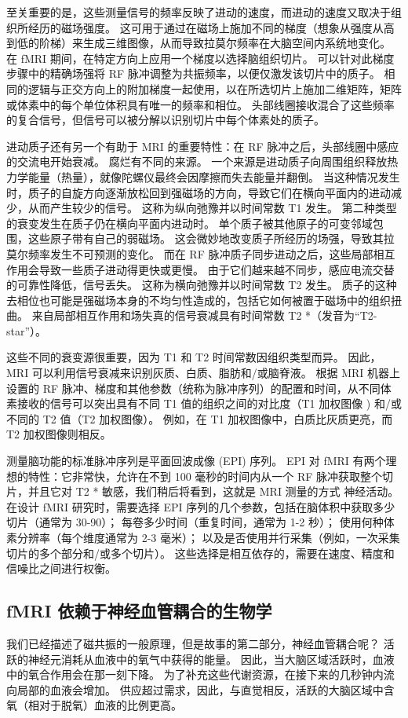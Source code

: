 至关重要的是，这些测量信号的频率反映了进动的速度，而进动的速度又取决于组织所经历的磁场强度。 这可用于通过在磁场上施加不同的梯度（想象从强度从高到低的阶梯）来生成三维图像，从而导致拉莫尔频率在大脑空间内系统地变化。 在 fMRI 期间，在特定方向上应用一个梯度以选择脑组织切片。 可以针对此梯度步骤中的精确场强将 RF 脉冲调整为共振频率，以便仅激发该切片中的质子。 相同的逻辑与正交方向上的附加梯度一起使用，以在所选切片上施加二维矩阵，矩阵或体素中的每个单位体积具有唯一的频率和相位。 头部线圈接收混合了这些频率的复合信号，但信号可以被分解以识别切片中每个体素处的质子。

进动质子还有另一个有助于 MRI 的重要特性：在 RF 脉冲之后，头部线圈中感应的交流电开始衰减。 腐烂有不同的来源。 一个来源是进动质子向周围组织释放热力学能量（热量），就像陀螺仪最终会因摩擦而失去能量并翻倒。 当这种情况发生时，质子的自旋方向逐渐放松回到强磁场的方向，导致它们在横向平面内的进动减少，从而产生较少的信号。 这称为纵向弛豫并以时间常数 T1 发生。 第二种类型的衰变发生在质子仍在横向平面内进动时。 单个质子被其他原子的可变邻域包围，这些原子带有自己的弱磁场。 这会微妙地改变质子所经历的场强，导致其拉莫尔频率发生不可预测的变化。 而在 RF 脉冲质子同步进动之后，这些局部相互作用会导致一些质子进动得更快或更慢。 由于它们越来越不同步，感应电流交替的可靠性降低，信号丢失。 这称为横向弛豫并以时间常数 T2 发生。 质子的这种去相位也可能是强磁场本身的不均匀性造成的，包括它如何被置于磁场中的组织扭曲。 来自局部相互作用和场失真的信号衰减具有时间常数 T2 *（发音为“T2-star”）。

这些不同的衰变源很重要，因为 T1 和 T2 时间常数因组织类型而异。 因此，MRI 可以利用信号衰减来识别灰质、白质、脂肪和/或脑脊液。 根据 MRI 机器上设置的 RF 脉冲、梯度和其他参数（统称为脉冲序列）的配置和时间，从不同体素接收的信号可以突出具有不同 T1 值的组织之间的对比度（T1 加权图像 ) 和/或不同的 T2 值（T2 加权图像）。 例如，在 T1 加权图像中，白质比灰质更亮，而 T2 加权图像则相反。

测量脑功能的标准脉冲序列是平面回波成像 (EPI) 序列。 EPI 对 fMRI 有两个理想的特性：它非常快，允许在不到 100 毫秒的时间内从一个 RF 脉冲获取整个切片，并且它对 T2 * 敏感，我们稍后将看到，这就是 MRI 测量的方式 神经活动。 在设计 fMRI 研究时，需要选择 EPI 序列的几个参数，包括在脑体积中获取多少切片（通常为 30-90）； 每卷多少时间（重复时间，通常为 1-2 秒）； 使用何种体素分辨率（每个维度通常为 2-3 毫米）； 以及是否使用并行采集（例如，一次采集切片的多个部分和/或多个切片）。 这些选择是相互依存的，需要在速度、精度和信噪比之间进行权衡。


\subsection{fMRI 依赖于神经血管耦合的生物学}
我们已经描述了磁共振的一般原理，但是故事的第二部分，神经血管耦合呢？ 活跃的神经元消耗从血液中的氧气中获得的能量。 因此，当大脑区域活跃时，血液中的氧合作用会在那一刻下降。 为了补充这些代谢资源，在接下来的几秒钟内流向局部的血液会增加。 供应超过需求，因此，与直觉相反，活跃的大脑区域中含氧（相对于脱氧）血液的比例更高。

